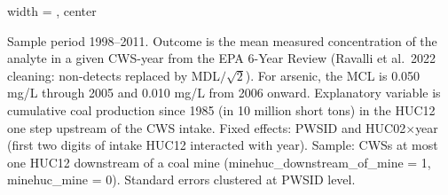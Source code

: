 \begin{table}[htbp]
\begin{adjustbox}{width = \textwidth, center}
      
      
   \end{adjustbox}
      {\tiny\linespread{1}\selectfont \par \raggedright 
   Sample period 1998--2011. Outcome is the mean measured concentration of the analyte in a given CWS-year from the EPA 6-Year Review (Ravalli et al.~2022 cleaning: non-detects replaced by MDL$/\sqrt{2}$). For arsenic, the MCL is 0.050 mg/L through 2005 and 0.010 mg/L from 2006 onward. Explanatory variable is cumulative coal production since 1985 (in 10 million short tons) in the HUC12 one step upstream of the CWS intake. Fixed effects: PWSID and HUC02$\times$year (first two digits of intake HUC12 interacted with year). Sample: CWSs at most one HUC12 downstream of a coal mine (minehuc\_downstream\_of\_mine = 1, minehuc\_mine = 0). Standard errors clustered at PWSID level.}
   
\end{table}


